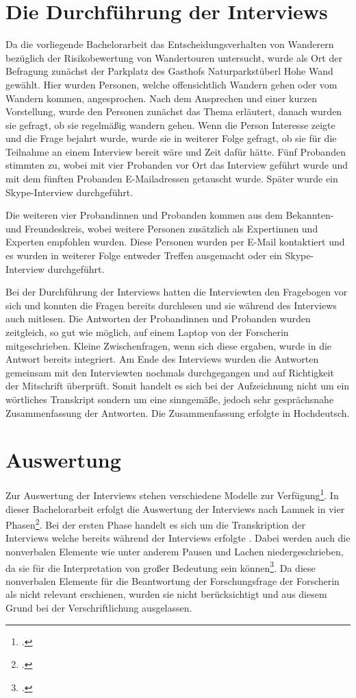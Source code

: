 \section{Die Durchführung der Interviews}

Da die vorliegende Bachelorarbeit das Entscheidungsverhalten von Wanderern bezüglich der Risikobewertung von Wandertouren untersucht, wurde als Ort der Befragung zunächst der Parkplatz des Gasthofs Naturparkstüberl Hohe Wand gewählt. Hier wurden Personen, welche offensichtlich Wandern gehen oder vom Wandern kommen, angesprochen.
Nach dem Ansprechen und einer kurzen Vorstellung, wurde den Personen zunächst das Thema erläutert, danach wurden sie gefragt, ob sie regelmäßig wandern gehen. Wenn die Person Interesse zeigte und die Frage bejahrt wurde, wurde sie in weiterer Folge gefragt, ob sie für die Teilnahme an einem Interview bereit wäre und Zeit dafür hätte. Fünf Probanden stimmten zu, wobei mit vier Probanden vor Ort das Interview geführt wurde und mit dem fünften Probanden  E-Mailadressen getauscht wurde. Später wurde ein Skype-Interview durchgeführt.

Die weiteren vier Probandinnen und Probanden kommen aus dem Bekannten- und Freundeskreis, wobei weitere Personen zusätzlich als Expertinnen und Experten empfohlen wurden. Diese Personen wurden per E-Mail kontaktiert und es wurden in weiterer Folge entweder Treffen ausgemacht oder ein Skype-Interview durchgeführt.

Bei der Durchführung der Interviews hatten die Interviewten den Fragebogen vor sich und konnten die Fragen bereits durchlesen und sie während des Interviews auch mitlesen. Die Antworten der Probandinnen und Probanden wurden zeitgleich, so gut wie möglich, auf einem Laptop von der Forscherin mitgeschrieben. Kleine Zwischenfragen, wenn sich diese ergaben, wurde in die Antwort bereits integriert. Am Ende des Interviews wurden die Antworten gemeinsam mit den Interviewten nochmals durchgegangen und auf Richtigkeit der Mitschrift überprüft.
Somit handelt es sich bei der Aufzeichnung nicht um ein wörtliches Transkript sondern um eine sinngemäße, jedoch sehr gesprächsnahe Zusammenfassung der Antworten. Die Zusammenfassung erfolgte in Hochdeutsch.

\section{Auswertung}

Zur Auswertung der Interviews stehen verschiedene Modelle zur Verfügung\footcite[S. 47]{mayer}. In dieser Bachelorarbeit erfolgt die Auswertung der Interviews nach Lamnek in vier Phasen\footcite[S. 367]{lamnek}. Bei der ersten Phase handelt es sich um die Transkription der Interviews welche bereits während der Interviews erfolgte . Dabei werden auch die nonverbalen Elemente wie unter anderem Pausen und Lachen niedergeschrieben, da sie für die Interpretation von großer Bedeutung sein können\footcite[S. 367]{lamnek}. Da diese nonverbalen Elemente für die Beantwortung der Forschungsfrage der Forscherin als nicht relevant erschienen, wurden sie nicht berücksichtigt und aus diesem Grund bei der Verschriftlichung ausgelassen.

